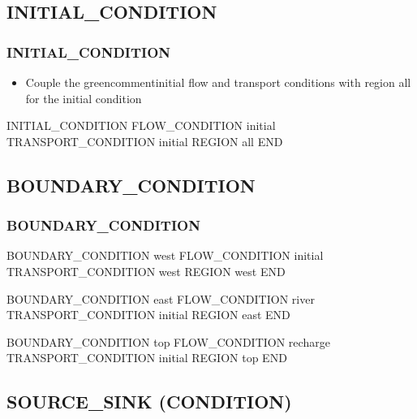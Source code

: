 \documentclass{beamer}
\newcommand\greencomment[1]{{{\color{green} #1}}}
\begin{document}
\subsection{INITIAL\_CONDITION}

\begin{frame}[fragile]\frametitle{INITIAL\_CONDITION}

\begin{itemize}
\item Couple the greencomment{initial} flow and transport conditions with region \greencomment{all} for the initial condition
\end{itemize}

\begin{semiverbatim}

INITIAL_CONDITION
  FLOW_CONDITION initial
  TRANSPORT_CONDITION initial
  REGION all
END

\end{semiverbatim}

\end{frame}

\subsection{BOUNDARY\_CONDITION}

\begin{frame}\frametitle{BOUNDARY\_CONDITION}

\small
\begin{semiverbatim}
BOUNDARY_CONDITION west
  FLOW_CONDITION initial
  TRANSPORT_CONDITION west
  REGION west
END

BOUNDARY_CONDITION east
  FLOW_CONDITION river
  TRANSPORT_CONDITION initial
  REGION east
END

BOUNDARY_CONDITION top
  FLOW_CONDITION recharge
  TRANSPORT_CONDITION initial
  REGION top
END
\end{semiverbatim}

\end{frame}

\subsection{SOURCE\_SINK (CONDITION)}
\end{document}
